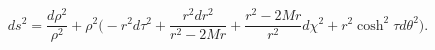 \begin{equation}
\label{s bubble metric} ds^2=\frac{d \rho^2}{\rho^2} + \rho^2 \biggl( -r^2 d \tau^2 + \frac{r^2dr^2}{r^2-2Mr} + \frac{r^2-2Mr}{r^2} {d
\chi^2} + r^2 \cosh ^2 \tau d \theta^2 \biggr) .
\end{equation}

